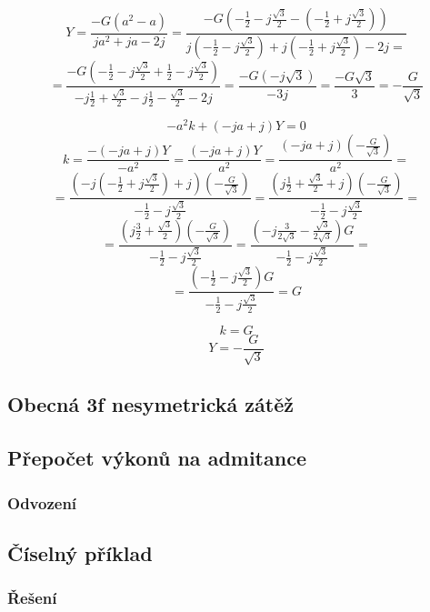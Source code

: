 \documentclass{article}
\begin{document}
$$
    Y = \frac{- G (a^2 - a)}{j a^2 + j a - 2 j} = \frac{
        - G \left( -\frac{1}{2} - j \frac{\sqrt{3}}{2} - \left( -\frac{1}{2} + j \frac{\sqrt{3}}{2} \right) \right)
    }{
        j \left( -\frac{1}{2} - j \frac{\sqrt{3}}{2} \right) + j \left( -\frac{1}{2} + j \frac{\sqrt{3}}{2} \right) - 2 j =
    }
$$
$$
    = \frac{
        - G \left( -\frac{1}{2} - j \frac{\sqrt{3}}{2} + \frac{1}{2} - j \frac{\sqrt{3}}{2} \right)
    }{
        -j \frac{1}{2} + \frac{\sqrt{3}}{2} - j \frac{1}{2} - \frac{\sqrt{3}}{2} - 2 j
    } = \frac{
        - G \left( -j \sqrt{3} \right)
    }{
        -3 j
    } = \frac{- G \sqrt{3}}{3} = -\frac{G}{\sqrt{3}}
$$

$$
    -a^2 k + (-j a + j) Y = 0
$$
$$
    k = \frac{- (-j a + j) Y}{-a^2} = \frac{(-j a + j) Y}{a^2} = \frac{(-j a + j) \left( -\frac{G}{\sqrt{3}} \right)}{a^2} =
$$
$$
    = \frac{
        \left( -j \left( -\frac{1}{2} + j \frac{\sqrt{3}}{2} \right) + j \right) \left( -\frac{G}{\sqrt{3}} \right)
    }{
        -\frac{1}{2} - j \frac{\sqrt{3}}{2}
    } = \frac{
        \left( j \frac{1}{2} + \frac{\sqrt{3}}{2} + j \right) \left( -\frac{G}{\sqrt{3}} \right)
    }{
        -\frac{1}{2} - j \frac{\sqrt{3}}{2}
    } =
$$
$$
    = \frac{
        \left( j \frac{3}{2} + \frac{\sqrt{3}}{2} \right) \left( -\frac{G}{\sqrt{3}} \right)
    }{
        -\frac{1}{2} - j \frac{\sqrt{3}}{2}
    } = \frac{
        \left( - j \frac{3}{2 \sqrt{3}} - \frac{\sqrt{3}}{2 \sqrt{3}} \right) G
    }{
        -\frac{1}{2} - j \frac{\sqrt{3}}{2}
    } =
$$
$$
    = \frac{
        \left( -\frac{1}{2} - j \frac{\sqrt{3}}{2} \right) G
    }{
        -\frac{1}{2} - j \frac{\sqrt{3}}{2}
    } = G
$$

$$
    k = G
$$
$$
    Y = -\frac{G}{\sqrt{3}}
$$


\subsection{Obecná 3f nesymetrická zátěž \spicy \spicy \spicy}


\subsection{Přepočet výkonů na admitance}

\subsubsection{Odvození \spicy \spicy \spicy}




\subsection{Číselný příklad}

\subsubsection{Řešení}
\end{document}
